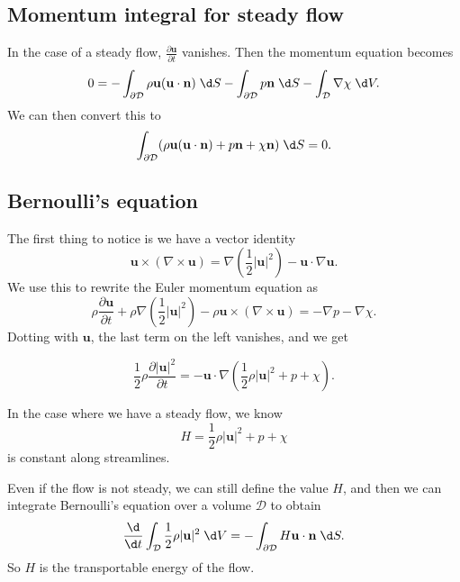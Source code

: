 \documentclass[a4paper]{article}
\begin{document}
\subsection{Momentum integral for steady flow}
In the case of a steady flow, $\frac{\partial \mathbf{u}}{\partial t}$ vanishes. Then the momentum equation becomes
\[
  0 = -\int_{\partial \mathcal{D}} \rho \mathbf{u} (\mathbf{u} \cdot \mathbf{n}) \;\d S - \int_{\partial \mathcal{D}}p \mathbf{n} \;\d S - \int_{\mathcal{D}} \nabla \chi \;\d V.
\]
We can then convert this to
\[
  \int_{\partial \mathcal{D}} (\rho \mathbf{u} (\mathbf{u}\cdot \mathbf{n}) + p \mathbf{n} + \chi \mathbf{n}) \;\d S = 0.
\]
\subsection{Bernoulli's equation}
The first thing to notice is we have a vector identity
\[
  \mathbf{u}\times (\nabla \times \mathbf{u}) = \nabla\left(\frac{1}{2}|\mathbf{u}|^2\right) - \mathbf{u}\cdot \nabla \mathbf{u}.
\]
We use this to rewrite the Euler momentum equation as
\[
  \rho \frac{\partial \mathbf{u}}{\partial t} + \rho \nabla \left(\frac{1}{2}|\mathbf{u}|^2\right) - \rho \mathbf{u}\times (\nabla \times \mathbf{u}) = -\nabla p - \nabla \chi.
\]
Dotting with $\mathbf{u}$, the last term on the left vanishes, and we get
\begin{prop}
  \[
    \frac{1}{2}\rho \frac{\partial|\mathbf{u}|^2}{\partial t} = -\mathbf{u}\cdot \nabla \left(\frac{1}{2} \rho |\mathbf{u}|^2 + p + \chi\right).
  \]
\end{prop}
In the case where we have a steady flow, we know
\[
  H = \frac{1}{2}\rho |\mathbf{u}|^2 + p + \chi
\]
is constant along streamlines.

Even if the flow is not steady, we can still define the value $H$, and then we can integrate Bernoulli's equation over a volume $\mathcal{D}$ to obtain
\[
  \frac{\d}{\d t}\int_{\mathcal{D}} \frac{1}{2}\rho |\mathbf{u}|^2 \;\d V = -\int_{\partial \mathcal{D}} H \mathbf{u}\cdot \mathbf{n} \;\d S.
\]
So $H$ is the transportable energy of the flow.
\end{document}
